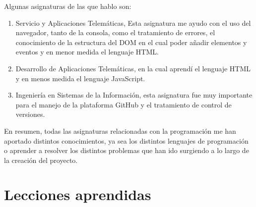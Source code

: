 \documentclass[a4paper, 12pt]{book}
\begin{document}
Algunas asignaturas de las que hablo son:
\begin{enumerate}  
\item Servicio y Aplicaciones Telemáticas, Esta asignatura me ayudo con el uso del navegador, tanto de la consola, como el tratamiento de errores, el conocimiento de la estructura del DOM en el cual poder añadir elementos y eventos y en menor medida el lenguaje HTML.
  \item Desarrollo de Aplicaciones Telemáticas, en la cual aprendí el lenguaje HTML y en menos medida el lenguaje JavaScript.
  \item Ingeniería en Sistemas de la Información, esta asignatura fue muy importante para el manejo de la plataforma GitHub y el tratamiento de control de versiones.
\end{enumerate}
En resumen, todas las asignaturas relacionadas con la programación me han aportado distintos conocimientos, ya sea los distintos lenguajes de programación o aprender a resolver los distintos problemas que han ido surgiendo a lo largo de la creación del proyecto.

\section{Lecciones aprendidas}
\label{sec:lecciones_aprendidas}
\end{document}
